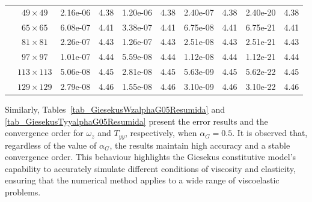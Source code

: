 \documentclass[preprint, 12pt]{elsarticle}
\begin{document}
\begin{center}
\begin{table}[H]
{\begin{tabular*}{\textwidth}{@{\extracolsep\fill}cccccccccc@{}}
    & $49\times 49$ & 2.16e-06 & 4.38 & 1.20e-06 & 4.38 & 2.40e-07 & 4.38 & 2.40e-20 & 4.38 \\
    & $65\times 65$ & 6.08e-07 & 4.41 & 3.38e-07 & 4.41 & 6.75e-08 & 4.41 & 6.75e-21 & 4.41 \\
    & $81\times 81$ & 2.26e-07 & 4.43 & 1.26e-07 & 4.43 & 2.51e-08 & 4.43 & 2.51e-21 & 4.43 \\
    & $97\times 97$ & 1.01e-07 & 4.44 & 5.59e-08 & 4.44 & 1.12e-08 & 4.44 & 1.12e-21 & 4.44 \\
    & $113\times 113$ & 5.06e-08 & 4.45 & 2.81e-08 & 4.45 & 5.63e-09 & 4.45 & 5.62e-22 & 4.45 \\
    & $129\times 129$ & 2.79e-08 & 4.46 & 1.55e-08 & 4.46 & 3.10e-09 & 4.46 & 3.10e-22 & 4.46 \\
    \hline
    \end{tabular*}
}
\end{table}
\end{center}

Similarly, Tables~\ref{tab_GiesekusWzalphaG05Resumida} and \ref{tab_GiesekusTyyalphaG05Resumida} present the error results and the convergence order for $\omega_{z}$ and $T_{yy}$, respectively, when $\alpha_G = 0.5$. It is observed that, regardless of the value of $\alpha_G$, the results maintain high accuracy and a stable convergence order. This behaviour highlights the Giesekus constitutive model's capability to accurately simulate different conditions of viscosity and elasticity, ensuring that the numerical method applies to a wide range of viscoelastic problems.
\end{document}
